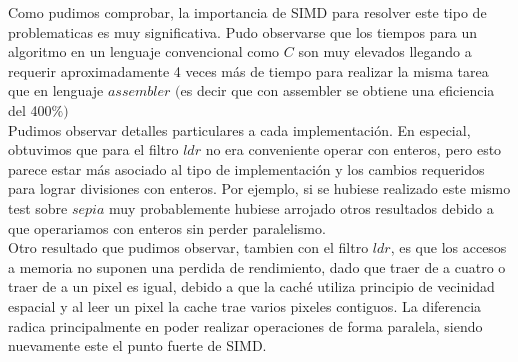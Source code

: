 Como pudimos comprobar, la importancia de SIMD para resolver este tipo de problematicas es muy significativa. 
Pudo observarse que los tiempos para un algoritmo en un lenguaje convencional como $C$ son muy elevados llegando a requerir aproximadamente 4 veces más de tiempo para realizar la misma tarea que en lenguaje $assembler$ $($es decir que con assembler se obtiene una eficiencia del 400$ \% )$\\

Pudimos observar detalles particulares a cada implementación. En especial, obtuvimos que para el filtro $ldr$ no era conveniente operar con enteros, pero esto parece estar más asociado al tipo de implementación y los cambios requeridos para lograr divisiones con enteros. Por ejemplo, si se hubiese realizado este mismo test sobre $sepia$ muy probablemente hubiese arrojado otros resultados debido a que operariamos con enteros sin perder paralelismo.\\

Otro resultado que pudimos observar, tambien con el filtro $ldr$, es que los accesos a memoria no suponen una perdida de rendimiento, dado que traer de a cuatro o traer de a un pixel es igual, debido a que la caché utiliza principio de vecinidad espacial y al leer un pixel la cache trae varios pixeles contiguos. La diferencia radica principalmente en poder realizar operaciones de forma paralela, siendo nuevamente este el punto fuerte de SIMD. \\


